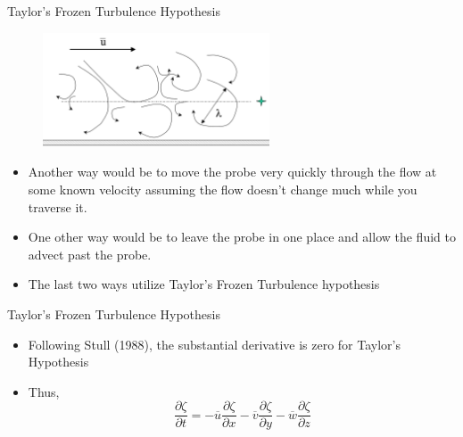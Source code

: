 
\begin{frame}{Taylor's Frozen Turbulence Hypothesis}
\begin{figure}
	\includegraphics[width=0.6\textwidth]{frozen.png}
\end{figure}
\begin{itemize}
	\item Another way would be to move the probe very quickly through the flow at some known velocity assuming the flow doesn’t change much while you traverse it. 
	\item One other way would be to leave the probe in one place and allow the fluid to advect past the probe. 
	\item The last two ways utilize Taylor’s Frozen Turbulence hypothesis
\end{itemize}
\end{frame}


\begin{frame}{Taylor's Frozen Turbulence Hypothesis}

\begin{itemize}
	\item Following Stull (1988), the substantial derivative is zero for Taylor's Hypothesis
	\item Thus, $$\frac{\partial \zeta}{\partial t} = -\overline{u}\frac{\partial \zeta}{\partial x}-\overline{v}\frac{\partial \zeta}{\partial y}-\overline{w}\frac{\partial \zeta}{\partial z}$$
\end{itemize}
\end{frame}



